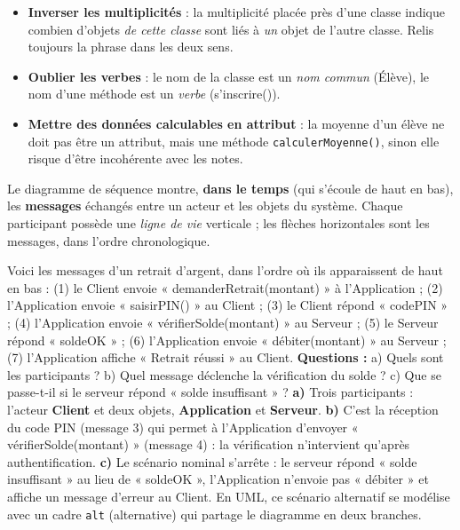 \documentclass[11pt]{article}
\newcounter{popsec}
\newcounter{popsub}
\newcommand{\courssub}[1]{%
  \stepcounter{popsub}%
  \par\vspace{9pt}\noindent{\popxbold\fontsize{11.5}{13}\selectfont\color{popink}{\color{poporange}\thepopsec.\thepopsub}\hspace{6pt}#1}\par\nopagebreak\vspace{4pt}
}
\begin{document}
\begin{attention}
\begin{itemize}
\item \textbf{Inverser les multiplicités} : la multiplicité placée près d'une classe indique combien d'objets \emph{de cette classe} sont liés à \emph{un} objet de l'autre classe. Relis toujours la phrase dans les deux sens.
\item \textbf{Oublier les verbes} : le nom de la classe est un \emph{nom commun} (Élève), le nom d'une méthode est un \emph{verbe} (s'inscrire()).
\item \textbf{Mettre des données calculables en attribut} : la moyenne d'un élève ne doit pas être un attribut, mais une méthode \texttt{calculerMoyenne()}, sinon elle risque d'être incohérente avec les notes.
\end{itemize}
\end{attention}

\courssub{Complément : lire un diagramme de séquence}

Le diagramme de séquence montre, \textbf{dans le temps} (qui s'écoule de haut en bas), les \textbf{messages} échangés entre un acteur et les objets du système. Chaque participant possède une \emph{ligne de vie} verticale ; les flèches horizontales sont les messages, dans l'ordre chronologique.

\begin{exoresolu}
Voici les messages d'un retrait d'argent, dans l'ordre où ils apparaissent de haut en bas : (1) le Client envoie « demanderRetrait(montant) » à l'Application ; (2) l'Application envoie « saisirPIN() » au Client ; (3) le Client répond « codePIN » ; (4) l'Application envoie « vérifierSolde(montant) » au Serveur ; (5) le Serveur répond « soldeOK » ; (6) l'Application envoie « débiter(montant) » au Serveur ; (7) l'Application affiche « Retrait réussi » au Client.
\textbf{Questions :} a) Quels sont les participants ? b) Quel message déclenche la vérification du solde ? c) Que se passe-t-il si le serveur répond « solde insuffisant » ?
\tcblower
\textbf{a)} Trois participants : l'acteur \textbf{Client} et deux objets, \textbf{Application} et \textbf{Serveur}.
\textbf{b)} C'est la réception du code PIN (message 3) qui permet à l'Application d'envoyer « vérifierSolde(montant) » (message 4) : la vérification n'intervient qu'après authentification.
\textbf{c)} Le scénario nominal s'arrête : le serveur répond « solde insuffisant » au lieu de « soldeOK », l'Application n'envoie pas « débiter » et affiche un message d'erreur au Client. En UML, ce scénario alternatif se modélise avec un cadre \texttt{alt} (alternative) qui partage le diagramme en deux branches.
\end{exoresolu}
\end{document}
